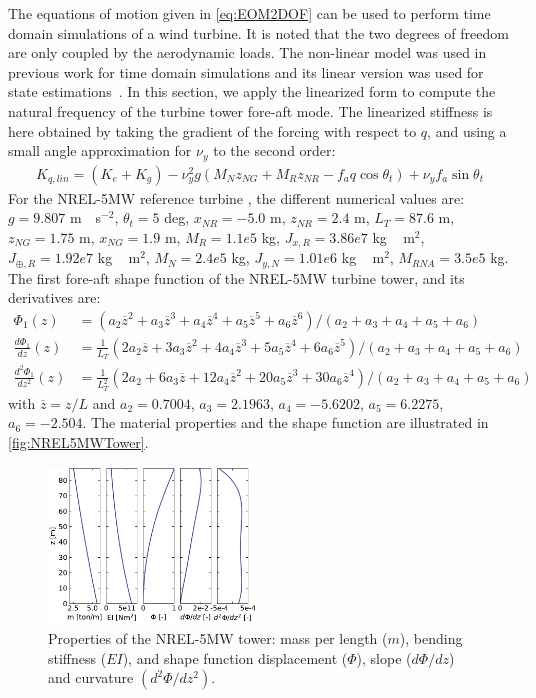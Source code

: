 \documentclass[wes, manuscript]{copernicus}
\renewcommand{\bar}{\overline}
\begin{document}
The equations of motion given in \autoref{eq:EOM2DOF} can be used to perform time domain simulations of a wind turbine.
It is noted that the two degrees of freedom are only coupled by the aerodynamic loads.
The non-linear model was used in previous work for time domain simulations and its linear version was used for state estimations~\citep{Branlard:2020twin,Branlard:2020twinOF}.
In this section, we apply the linearized form to compute the natural frequency of the turbine tower fore-aft mode.
The linearized stiffness is here obtained by taking the gradient of the forcing with respect to $q$, and using a small angle approximation for $\nu_y$ to the second order:
\begin{align}
K_{q,lin}= (K_{e} + K_g)
- \nu_{y}^{2} g \left(M_N z_{NG} + M_{R} z_{NR} - f_a q \cos\theta_t\right)
+ \nu_{y} f_a \sin\theta_t 
\end{align}
For the NREL-5MW reference turbine \citep{nrel5mw}, the different numerical values are:
$g=9.807$ \unit{m\cdot s}$^{-2}$,
$\theta_t=5$ \unit{deg},
$x_{NR}=-5.0$ \unit{m},
$z_{NR}= 2.4$ \unit{m},
$L_T=87.6$ \unit{m},
$z_{NG}=1.75$ \unit{m},
$x_{NG}=1.9$ \unit{m},
$M_R= 1.1e5$ \unit{kg},
$J_{x,R}=3.86e7$ \unit{kg\,m}$^2$,
$J_{\oplus,R}=1.92e7$ \unit{kg\,m}$^2$,
$M_N=2.4e5$ \unit{kg},
$J_{y,N} =1.01e6$ \unit{kg\,m}$^2$,
$M_{RNA}=3.5e5$ \unit{kg}.
The first fore-aft shape function of the NREL-5MW turbine tower, and its derivatives are:
\begin{align}
   \Phi_1(z) &= (a_2 \bar{z}^2+ a_3 \bar{z}^3+ a_4 \bar{z}^4+ a_5 \bar{z}^5+ a_6 \bar{z}^6)/(a_2+a_3+a_4+a_5+a_6)\nonumber \\
   \frac{d\Phi_1}{dz}(z) &= \frac{1}{L_T}(2a_2 \bar{z}+ 3a_3 \bar{z}^2+ 4a_4 \bar{z}^3+ 5a_5 \bar{z}^4+ 6a_6 \bar{z}^5)/(a_2+a_3+a_4+a_5+a_6)\label{eq:ShapeFunctionsPoly}  \\  
   \frac{d^2\Phi_1}{dz^2}(z) &= \frac{1}{L_T^2}(2a_2+ 6a_3 \bar{z}+ 12a_4 \bar{z}^2+ 20a_5 \bar{z}^3+ 30a_6 \bar{z}^4)/(a_2+a_3+a_4+a_5+a_6) 
   \nonumber
\end{align}
with $\bar{z}=z/L$ and $a_2=0.7004$, $ a_3=2.1963$, $a_4=-5.6202$, $a_5=6.2275$, $a_6=-2.504$.
The material properties and the shape function are illustrated in \autoref{fig:NREL5MWTower}. 
\noindent\begin{figure}[!htb]\centering%
  \includegraphics[width=0.49\textwidth]{figs/NREL5MWTower.pdf}
  \caption{Properties of the NREL-5MW tower: mass per length ($m$), bending stiffness ($EI$), and shape function displacement ($\Phi$), slope ($d\Phi/dz$) and curvature $(d^2\Phi/dz^2)$.}\label{fig:NREL5MWTower}%
\end{figure}
\end{document}
